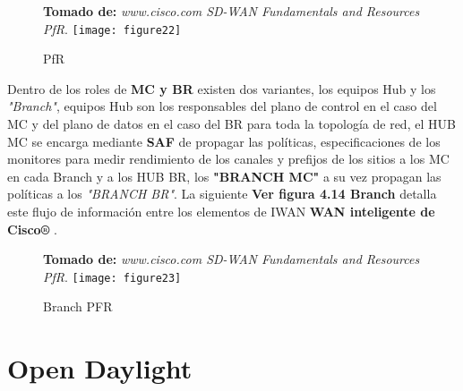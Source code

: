 \begin{figure}[htbp]
 \textbf{Tomado de:} \textit{www.cisco.com SD-WAN Fundamentals and Resources PfR}.
  \centering
    {\texttt{[image: figure22]}}%
  \caption{PfR}
  \label{fig:fig2subfig}
\end{figure}

Dentro de los roles de \textbf{MC y BR} existen dos variantes, los equipos Hub y los \textit{"Branch"}, equipos Hub son los responsables del plano de control en el caso del MC y del plano de datos en el caso del BR para toda la topología de red, el HUB MC se encarga mediante \textbf{SAF} de propagar las políticas, especificaciones de los monitores para medir rendimiento de los canales y prefijos de los sitios a los MC en cada Branch y a los HUB BR, los \textbf{"BRANCH MC"} a su vez propagan las políticas a los \textit{"BRANCH BR"}. La siguiente \textbf{Ver figura 4.14 Branch} detalla este flujo de información entre los elementos de IWAN \textbf{WAN inteligente de Cisco®} . 

\begin{figure}[htbp]
 \textbf{Tomado de:} \textit{www.cisco.com SD-WAN Fundamentals and Resources PfR}.
  \centering
    {\texttt{[image: figure23]}}%
  \caption{Branch PFR}
  \label{fig:fig2subfig}
\end{figure}
\section{Open Daylight}
\label{sec:Open Daylight}


